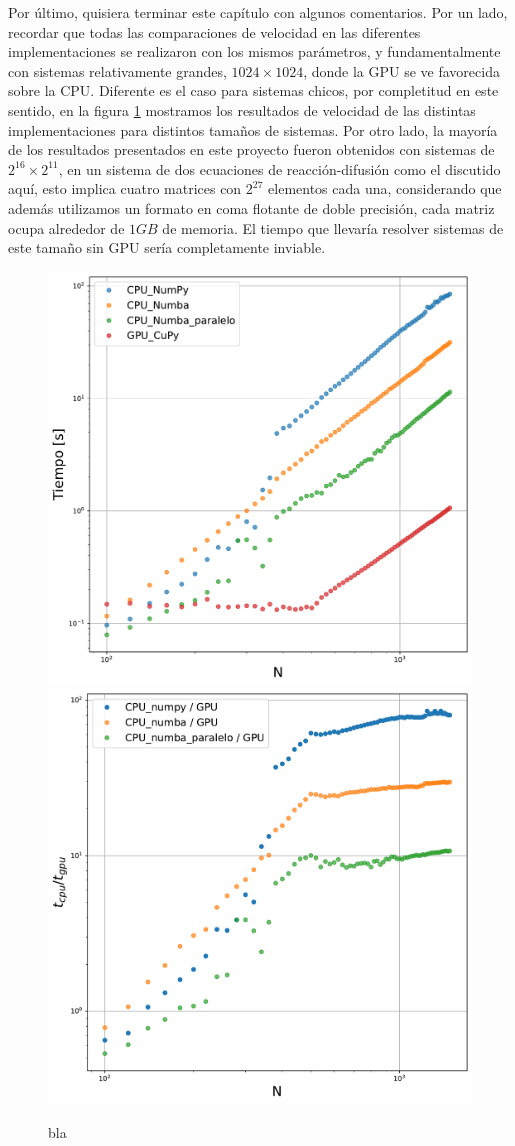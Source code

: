 Por último, quisiera terminar este capítulo con algunos comentarios. Por un lado, recordar que todas las comparaciones de velocidad en las diferentes 
implementaciones se realizaron con los mismos parámetros, y fundamentalmente con sistemas relativamente grandes, $1024\times1024$, donde la GPU se ve 
favorecida sobre la CPU. Diferente es el caso para sistemas chicos, por completitud en este sentido, en la figura \ref{fig:cpuvsgpu} mostramos 
los resultados de velocidad de las distintas implementaciones para distintos tamaños de sistemas. Por otro lado, la mayoría de los resultados presentados  
en este proyecto fueron obtenidos con sistemas de $2^{16} \times 2^{11}$, en un sistema de dos ecuaciones de reacción-difusión como el discutido aquí,
esto implica cuatro matrices con $2^{27}$ elementos cada una, considerando que además utilizamos un formato en coma flotante de doble precisión, cada 
matriz ocupa alrededor de $1GB$ de memoria. El tiempo que llevaría resolver sistemas de este tamaño sin GPU sería completamente inviable. 

\begin{figure}[h]
  \centering
  \includegraphics[width=.47\textwidth]{cpu_gpu_t.pdf}
  \includegraphics[width=.47\textwidth]{cpu_gpu_ratio.pdf}
  \caption{bla}
  \label{fig:cpuvsgpu}
\end{figure}

